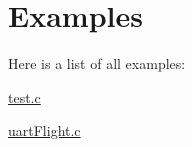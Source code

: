 \section{Examples}
Here is a list of all examples\-:\begin{DoxyCompactItemize}
\item 
\hyperlink{test_8c-example}{test.\-c}
\item 
\hyperlink{uart_flight_8c-example}{uart\-Flight.\-c}
\end{DoxyCompactItemize}
